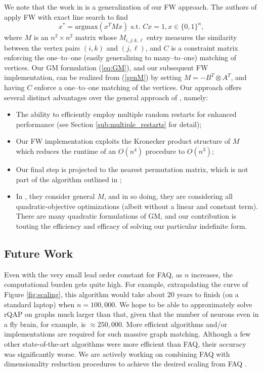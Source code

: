 \documentclass[10pt]{article}
\begin{document}
We note that the work in \cite{otherFW} is a generalization of our FW approach.  The authors of \cite{otherFW} apply FW with exact line search to find
\begin{equation}
\label{genM}
x^* = \text{argmax}(x
^TMx) \text{ s.t. } Cx = 1, x \in \{0, 1\}^
n,
\end{equation}
where $M$ is an $n^2\times n^2$ matrix whose $M_{i,j;k,\ell}$ entry measures the similarity between the vertex pairs $(i, k)$ and $(j, \ell)$, and $C$ is a constraint matrix enforcing the one--to--one (easily generalizing to many--to--one) matching of vertices.  Our GM formulation (\ref{eq:GM}), and our subsequent FW implementation, can be realized from (\ref{genM}) by setting $M=-B^T\otimes A^T$, and having $C$ enforce a one--to--one matching of the vertices.
Our approach offers several distinct advantages over the general approach of \cite{otherFW}, namely:
\begin{itemize}
\item  The ability to efficiently employ multiple random restarts for enhanced performance (see Section \ref{sub:multiple_restarts} for detail);
\item  Our FW implementation exploits the Kronecker product structure of $M$ which
reduces the runtime of an $O(n^4)$ procedure to $O(n^3)$;
\item  Our final step is projected to the nearest permutation matrix, which is not  part of the algorithm outlined in \cite{otherFW};
\item In \cite{otherFW}, they consider general $M$, and in so doing, they are considering all quadratic-objective optimizations (albeit without a linear and constant term).  There are many quadratic formulations of GM, and our contribution is touting the efficiency and efficacy of solving our particular indefinite form.
\end{itemize}



\subsection{Future Work}

Even with the very small lead order constant for FAQ, as $n$ increases, the computational burden gets quite high.  For example, extrapolating the curve of Figure \ref{fig:scaling}, this algorithm would take about 20 years to finish (on a standard laptop) when $n=100,000$.  We hope to be able to approximately solve rQAP on graphs much larger than that, given that the number of neurons even in a fly brain, for example, is $\approx 250,000$.  More efficient algorithms and/or implementations are required for such massive graph matching. Although a few other state-of-the-art algorithms were more efficient than FAQ, their accuracy was significantly worse.  We are actively working on combining FAQ with dimensionality reduction procedures to achieve the desired scaling from FAQ \cite{Lyzinski2013}.
\end{document}
